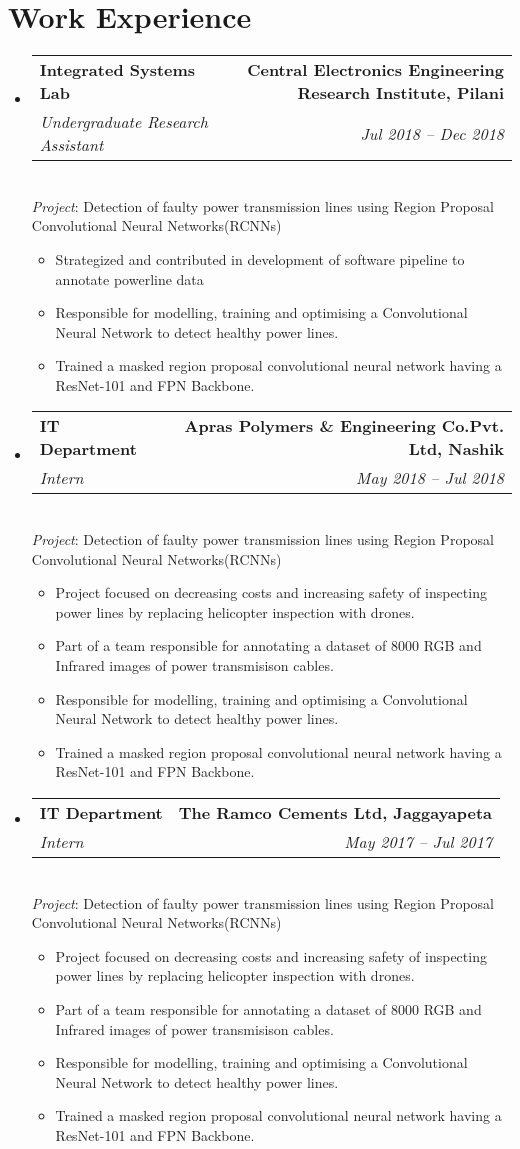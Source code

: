 \documentclass[a4paper]{article}
\makeatletter
\newcommand{\resumeSubheading}[4]{
	\vspace{-1pt}\item
	\begin{tabular*}{0.97\textwidth}[t]{l@{\extracolsep{\fill}}r}
		\textbf{\normalsize #1} & {\normalsize #2} \\
		\textit{\small#3} & \textit{\small #4} \\
	\end{tabular*}
	\smallskip \\
}
\newcommand{\resumeSubItemOneArg}[1]{\item \small #1\vspace{-1pt}}
\newcommand{\resumeSubHeadingListStart}{\begin{itemize}[leftmargin=*]}
\newcommand{\resumeSubHeadingListEnd}{\end{itemize}}
\newcommand{\resumeItemListStart}{\begin{itemize} \vspace*{-5pt}}
\newcommand{\resumeItemListEnd}{\end{itemize}}
\makeatother
\begin{document}

\section{Work Experience}
\justifying
\resumeSubHeadingListStart
\resumeSubheading
{Integrated Systems Lab}{\textbf{Central Electronics Engineering Research Institute, Pilani}}
{Undergraduate Research Assistant}{Jul 2018 -- Dec 2018}
\emph{Project}: Detection of faulty power transmission lines using Region Proposal Convolutional Neural Networks(RCNNs)
\resumeItemListStart
\resumeSubItemOneArg{Strategized and contributed in development of software pipeline to annotate powerline data}
\resumeSubItemOneArg{Responsible for modelling, training and optimising a Convolutional Neural Network to detect healthy power lines.}
\resumeSubItemOneArg{Trained a masked region proposal convolutional neural network having a ResNet-101 and FPN Backbone.}
\resumeItemListEnd

\resumeSubheading
{IT Department}{\textbf{Apras Polymers \& Engineering Co.Pvt. Ltd, Nashik}}
{Intern}{May 2018 -- Jul 2018}
\emph{Project}: Detection of faulty power transmission lines using Region Proposal Convolutional Neural Networks(RCNNs)
\resumeItemListStart
\resumeSubItemOneArg{Project focused on decreasing costs and increasing safety of inspecting power lines by replacing helicopter inspection with drones.}
\resumeSubItemOneArg{Part of a team responsible for annotating a dataset of 8000 RGB and Infrared images of power transmisison cables.}
\resumeSubItemOneArg{Responsible for modelling, training and optimising a Convolutional Neural Network to detect healthy power lines.}
\resumeSubItemOneArg{Trained a masked region proposal convolutional neural network having a ResNet-101 and FPN Backbone.}
\resumeItemListEnd

\resumeSubheading
{IT Department}{\textbf{The Ramco Cements Ltd, Jaggayapeta}}
{Intern}{May 2017 -- Jul 2017}
\emph{Project}: Detection of faulty power transmission lines using Region Proposal Convolutional Neural Networks(RCNNs)
\resumeItemListStart
\resumeSubItemOneArg{Project focused on decreasing costs and increasing safety of inspecting power lines by replacing helicopter inspection with drones.}
\resumeSubItemOneArg{Part of a team responsible for annotating a dataset of 8000 RGB and Infrared images of power transmisison cables.}
\resumeSubItemOneArg{Responsible for modelling, training and optimising a Convolutional Neural Network to detect healthy power lines.}
\resumeSubItemOneArg{Trained a masked region proposal convolutional neural network having a ResNet-101 and FPN Backbone.}
\resumeItemListEnd
\resumeSubHeadingListEnd
\end{document}
